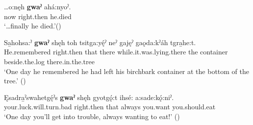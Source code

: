 \ea
\label{ex:gpar88}
\gll …o:nęh \textbf{gwaˀ} ahá:nyoˀ.\\
now right.then he.died\\
\glt ‘…finally he died.’(\cite{carrier_legends_2013})
\z

\ea
\label{ex:gpar89}
\gll Sa̱hohsa:ˀ \textbf{gwaˀ} shęh toh tsitga:yę́ˀ neˀ gajęˀ gaǫda:kˀáh tgra̱he:t.\\
He.remembered right.then that there while.it.was.lying.there the container beside.the.log there.in.the.tree\\
\glt ‘One day he remembered he had left his birchbark container at the bottom of the tree.’ (\cite{carrier_legends_2013})
\z

\ea
\label{ex:gpar90}
\gll Ęsadra̱ˀswahetgę́ˀs \textbf{gwaˀ} shęh gyotgǫ́:t ihsé: a:sade:kǫ́:niˀ.\\
your.luck.will.turn.bad right.then that always you.want you.should.eat\\
\glt ‘One day you’ll get into trouble, always wanting to eat!’ (\cite{carrier_legends_2013})
\z

